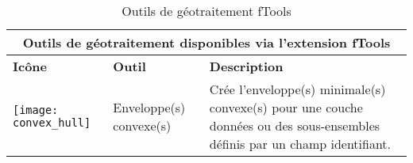 \begin{table}[ht]
\centering
\caption{Outils de géotraitement fTools}\label{tab:ftool_geoprocessing}\medskip
 \begin{tabular}{|p{0.3in}|p{0.8in}|p{5.1in}|}
 \hline \multicolumn{3}{|c|}{\textbf{Outils de géotraitement disponibles via l'extension fTools}} \\
 \hline \textbf{Icône} & \textbf{Outil} & \textbf{Description} \\
 \hline \texttt{[image: convex\_hull]} & Enveloppe(s) convexe(s) & Crée l'enveloppe(s) minimale(s) convexe(s) pour une couche données ou des sous-ensembles définis par un champ identifiant. \\

\end{tabular}
\end{table}
